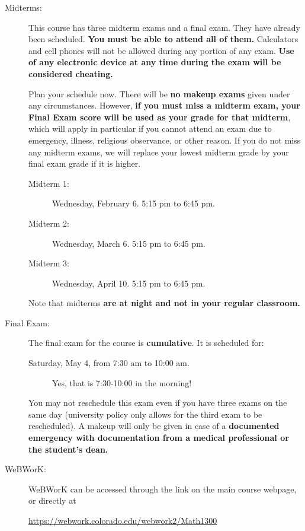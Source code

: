 \documentclass[11pt]{article}
\begin{document}
\begin{description}
\item[Midterms:] This course has three midterm exams and a final
  exam. They have already been scheduled. \textbf{You must be able to
    attend all of them.} Calculators and cell phones will not be
  allowed during any portion of any exam. \textbf{Use of any
    electronic device at any time during the exam will be considered
    cheating.}

  Plan your schedule now. There will be \textbf{no makeup exams} given
  under any circumstances. However, \textbf{if you must miss a midterm
    exam, your Final Exam score will be used as your grade for that
    midterm}, which will apply in particular if you cannot attend an
  exam due to emergency, illness, religious observance, or other
  reason.  If you do not miss any midterm exams, we will replace your
  lowest midterm grade by your final exam grade if it is higher.

  \begin{description}
  \item[Midterm 1:] Wednesday, February 6. 5:15 pm to 6:45 pm.
  \item[Midterm 2:] Wednesday, March 6. 5:15 pm to 6:45 pm.
  \item[Midterm 3:] Wednesday, April 10. 5:15 pm to 6:45 pm.
  \end{description}
  Note that midterms {\bf are at night and not in your regular
    classroom.}

\item[Final Exam:] The final exam for the course is
  \textbf{cumulative}.  It is scheduled for:

  \begin{description}
  \item[Saturday, May 4, from 7:30 am to 10:00 am.] Yes, that is
    7:30-10:00 in the morning!
  \end{description}

  You may not reschedule this exam even if you have three exams on the
  same day (university policy only allows for the third exam to be
  rescheduled). A makeup will only be given in case of a
  \textbf{documented emergency with documentation from a medical
    professional or the student's dean.}

\item[WeBWorK:] WeBWorK can be accessed through the link on the main
  course webpage, or directly at

  \begin{center}
    \url{https://webwork.colorado.edu/webwork2/Math1300}
  \end{center}


\end{description}
\end{document}
